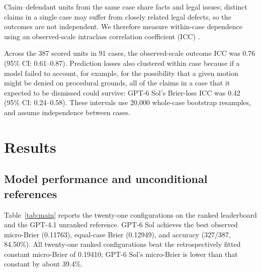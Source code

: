 \documentclass[11pt]{article}
\begin{document}
Claim--defendant units from the same case share facts and legal issues; distinct claims in a single case may suffer from closely related legal defects, so the outcomes are not independent. We therefore measure within-case dependence using an observed-scale intraclass correlation coefficient (ICC) \citep{makicc}.

Across the 387 scored units in 91 cases, the observed-scale outcome ICC was 0.76 (95\% CI: 0.61--0.87). Prediction losses also clustered within case because if a model failed to account, for example, for the possibility that a given motion might be denied on procedural grounds, all of the claims in a case that it expected to be dismissed could survive: GPT-6 Sol's Brier-loss ICC was 0.42 (95\% CI: 0.24--0.58). These intervals use 20,000 whole-case bootstrap resamples, and assume independence between cases.

\section{Results}

\subsection{Model performance and unconditional references}
Table~\ref{tab:main} reports the twenty-one configurations on the ranked leaderboard and the GPT-4.1 unranked reference. GPT-6 Sol achieves the best observed micro-Brier (0.11763), equal-case Brier (0.12949), and accuracy (327/387, 84.50\%). All twenty-one ranked configurations beat the retrospectively fitted constant micro-Brier of 0.19410; GPT-6 Sol's micro-Brier is lower than that constant by about 39.4\%.
\end{document}
